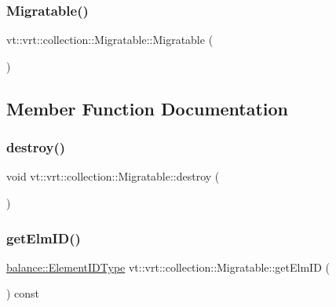 \subsubsection{\texorpdfstring{Migratable()}{Migratable()}}
{\footnotesize\ttfamily vt\+::vrt\+::collection\+::\+Migratable\+::\+Migratable (\begin{DoxyParamCaption}{ }\end{DoxyParamCaption})}



\subsection{Member Function Documentation}
\mbox{\label{structvt_1_1vrt_1_1collection_1_1_migratable_a31effa8f54013d1a1794cd025c24e410}} 
\subsubsection{\texorpdfstring{destroy()}{destroy()}}
{\footnotesize\ttfamily void vt\+::vrt\+::collection\+::\+Migratable\+::destroy (\begin{DoxyParamCaption}{ }\end{DoxyParamCaption})\hspace{0.3cm}{\ttfamily [virtual]}}

\mbox{\label{structvt_1_1vrt_1_1collection_1_1_migratable_a05b1ac1b0b5adc3f25e7126508d42153}} 
\subsubsection{\texorpdfstring{get\+Elm\+I\+D()}{getElmID()}}
{\footnotesize\ttfamily \hyperlink{namespacevt_1_1vrt_1_1collection_1_1balance_a14c8d2c972f2913aa3f1636e5be0a120}{balance\+::\+Element\+I\+D\+Type} vt\+::vrt\+::collection\+::\+Migratable\+::get\+Elm\+ID (\begin{DoxyParamCaption}{ }\end{DoxyParamCaption}) const\hspace{0.3cm}{\ttfamily [inline]}}

